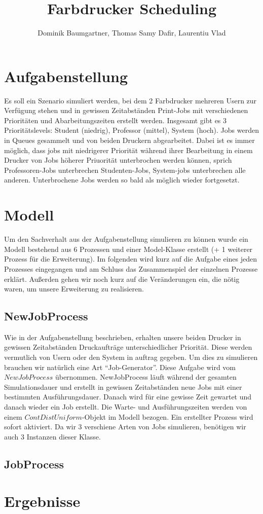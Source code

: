 \documentclass[12pt,a4paper]{article}
\title{Farbdrucker Scheduling}
\author{Dominik Baumgartner, Thomas Samy Dafir, Laurentiu Vlad}
\date{}
\begin{document}
	\maketitle
	
	\section{Aufgabenstellung}
	Es soll ein Szenario simuliert werden, bei dem 2 Farbdrucker mehreren Usern zur Verfügung stehen und in gewissen Zeitabständen Print-Jobs mit
	verschiedenen Prioritäten und Abarbeitungszeiten erstellt werden. Insgesamt gibt es 3 Prioritätslevels: Student (niedrig), Professor (mittel), System (hoch). Jobs 
	werden in Queues gesammelt und von beiden Druckern abgearbeitet. Dabei ist es immer möglich, dass jobs mit niedrigerer Priorität während ihrer Bearbeitung in 
	einem Drucker von Jobs höherer Priuorität unterbrochen werden können, sprich Professoren-Jobs unterbrechen Studenten-Jobs, System-jobs unterbrechen alle 
	anderen. Unterbrochene Jobs werden so bald als möglich wieder fortgesetzt.
	
	\section{Modell}
	Um den Sachverhalt aus der Aufgabenstellung simulieren zu können wurde ein Modell bestehend aus 6 Prozessen und einer Model-Klasse erstellt (+ 1 weiterer Prozess für die Erweiterung).
	Im folgenden wird kurz auf die Aufgabe eines jeden Prozesses eingegangen und am Schluss das Zusammenspiel der einzelnen Prozesse erklärt. Außerden gehen wir noch kurz auf die Veränderungen
	ein, die nötig waren, um unsere Erweiterung zu realisieren.
	
	\subsection{NewJobProcess}
	Wie in der Aufgabenstellung beschrieben, erhalten unsere beiden Drucker in gewissen Zeitabständen Druckaufträge unterschiedlicher Priorität. Diese werden vermutlich von Usern oder den System
	in auftrag gegeben. Um dies zu simulieren brauchen wir natürlich eine Art ``Job-Generator''. Diese Aufgabe wird vom $NewJobProcess$ übernommen. NewJobProcess läuft während der gesamten 
	Simulationsdauer und erstellt in gewissen Zeitabständen neue Jobs mit einer bestimmten Ausführungsdauer. Danach wird für eine gewisse Zeit gewartet und danach wieder ein Job erstellt. Die Warte-
	und Ausführungszeiten werden von einem $ContDistUniform$-Objekt im Modell bezogen. Ein erstellter Prozess wird sofort aktiviert. Da wir 3 verschiene Arten von Jobs simulieren, benötigen wir auch
	3 Instanzen dieser Klasse.
	
	\subsection{JobProcess}
		
	
	\section{Ergebnisse}
	
	
\end{document}
